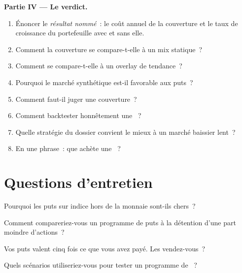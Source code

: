 \begin{problem}
\medskip\noindent\textbf{Partie IV --- Le verdict.}
\begin{enumerate}[resume]
\item Énoncer le \emph{résultat nommé}~: le coût annuel de la couverture et le taux de croissance du portefeuille avec et sans elle.
\item Comment la couverture se compare-t-elle à un mix statique~?
\item Comment se compare-t-elle à un overlay de tendance~?
\item Pourquoi le marché synthétique est-il favorable aux puts~?
\item Comment faut-il juger une couverture~?
\item Comment backtester honnêtement une ~?
\item Quelle stratégie du dossier convient le mieux à un marché baissier lent~?
\item En une phrase~: que achète une ~?
\end{enumerate}
\end{problem}

\section{Questions d'entretien}

\begin{interviewq}\label{iq:s2:tail-hedging-and-long-volatility:1}
Pourquoi les puts sur indice hors de la monnaie sont-ils chers~?
\end{interviewq}

\begin{interviewq}\label{iq:s2:tail-hedging-and-long-volatility:2}
Comment compareriez-vous un programme de puts à la détention d'une part moindre d'actions~?
\end{interviewq}

\begin{interviewq}\label{iq:s2:tail-hedging-and-long-volatility:3}
Vos puts valent cinq fois ce que vous avez payé. Les vendez-vous~?
\end{interviewq}

\begin{interviewq}\label{iq:s2:tail-hedging-and-long-volatility:4}
Quels scénarios utiliseriez-vous pour tester un programme de ~?
\end{interviewq}

